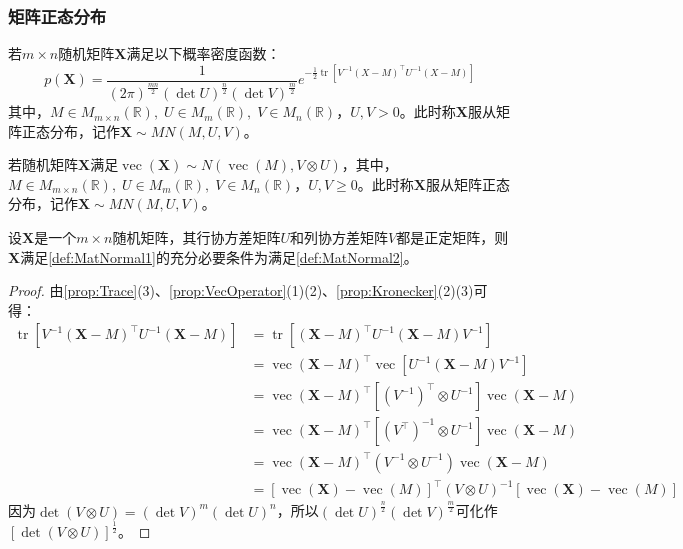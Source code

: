 \subsubsection{矩阵正态分布}
\begin{definition}\label{def:MatNormal1}
	若$m\times n$随机矩阵$\mathbf{X}$满足以下概率密度函数：
	\begin{equation*}
		p(\mathbf{X})=\frac{1}{(2\pi)^{\frac{mn}{2}}(\det U)^{\frac{n}{2}}(\det V)^{\frac{m}{2}}}e^{-\frac{1}{2}\operatorname{tr}[V^{-1}(X-M)^{\top}U^{-1}(X-M)]}
	\end{equation*}
	其中，$M\in M_{m\times n}(\mathbb{R}),\;U\in M_{m}(\mathbb{R}),\;V\in M_{n}(\mathbb{R})$，$U,V>0$。此时称$\mathbf{X}$服从矩阵正态分布，记作$\mathbf{X}\sim MN(M,U,V)$。
\end{definition}
\begin{definition}\label{def:MatNormal2}
	若随机矩阵$\mathbf{X}$满足$\operatorname{vec}(\mathbf{X})\sim N(\operatorname{vec}(M),V\otimes U)$，其中，$M\in M_{m\times n}(\mathbb{R}),\;U\in M_{m}(\mathbb{R}),\;V\in M_{n}(\mathbb{R})$，$U,V\geqslant0$。此时称$\mathbf{X}$服从矩阵正态分布，记作$\mathbf{X}\sim MN(M,U,V)$。
\end{definition}
\begin{theorem}
	设$\mathbf{X}$是一个$m\times n$随机矩阵，其行协方差矩阵$U$和列协方差矩阵$V$都是正定矩阵，则$\mathbf{X}$满足\cref{def:MatNormal1}的充分必要条件为满足\cref{def:MatNormal2}。
\end{theorem}
\begin{proof}
	由\cref{prop:Trace}(3)、\cref{prop:VecOperator}(1)(2)、\cref{prop:Kronecker}(2)(3)可得：
	\begin{align*}
		\operatorname{tr}[V^{-1}(\mathbf{X}-M)^{\top}U^{-1}(\mathbf{X}-M)]
		&=\operatorname{tr}[(\mathbf{X}-M)^{\top}U^{-1}(\mathbf{X}-M)V^{-1}] \\
		&=\operatorname{vec}(\mathbf{X}-M)^{\top}\operatorname{vec}[U^{-1}(\mathbf{X}-M)V^{-1}] \\
		&=\operatorname{vec}(\mathbf{X}-M)^{\top}[(V^{-1})^{\top}\otimes U^{-1}]\operatorname{vec}(\mathbf{X}-M) \\
		&=\operatorname{vec}(\mathbf{X}-M)^{\top}[(V^{\top})^{-1}\otimes U^{-1}]\operatorname{vec}(\mathbf{X}-M) \\
		&=\operatorname{vec}(\mathbf{X}-M)^{\top}(V^{-1}\otimes U^{-1})\operatorname{vec}(\mathbf{X}-M) \\
		&=[\operatorname{vec}(\mathbf{X})-\operatorname{vec}(M)]^{\top}(V\otimes U)^{-1}[\operatorname{vec}(\mathbf{X})-\operatorname{vec}(M)]
	\end{align*}
	因为$\det(V\otimes U)=(\det V)^m(\det U)^n$，所以$(\det U)^{\frac{n}{2}}(\det V)^{\frac{m}{2}}$可化作$[\det(V\otimes U)]^{\frac{1}{2}}$。
\end{proof}
